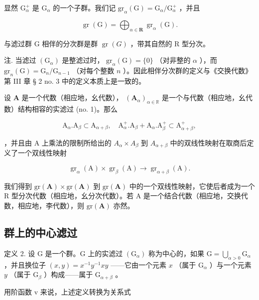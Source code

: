 显然 \(\mathrm{G}_{\alpha}^{+}\) 是 \(\mathrm{G}_{\alpha}\) 的一个子群。我们记 \(\mathrm{gr}_{\alpha}(\mathrm{G}) = \mathrm{G}_{\alpha} / \mathrm{G}_{\alpha}^{+}\) ，并且

\[
\operatorname{gr} (\mathrm{G}) = \bigoplus_ {\alpha \in \mathbf {R}} \operatorname{gr} _ {\alpha} (\mathrm{G}).
\]

与滤过群 G 相伴的分次群是群 \(\operatorname{gr}(G)\) ，带其自然的 R 型分次。

注. 当滤过 \((\mathrm{G}_{\alpha})\) 是整滤过时， \(\mathrm{gr}_{\alpha}(\mathrm{G}) = \{0\}\) （对非整的 \(\alpha\) ），而 \(\mathrm{gr}_n(\mathrm{G}) = \mathrm{G}_n / \mathrm{G}_{n - 1}\) （对每个整数 \(n\) ）。因此相伴分次群的定义与《交换代数》第 III 章 § 2 no. 3 中的定义本质上是一致的。

设 \(\mathbf{A}\) 是一个代数（相应地，幺代数）， \((\mathbf{A}_{\alpha})_{\alpha \in \mathbb{R}}\) 是一个与代数（相应地，幺代数）结构相容的实滤过 (no. 1)。那么

\[
\mathrm{A} _ {\alpha}. \mathrm{A} _ {\beta} \subset \mathrm{A} _ {\alpha + \beta}, \quad \mathrm{A} _ {\alpha} ^ {+}. \mathrm{A} _ {\beta} + \mathrm{A} _ {\alpha}. \mathrm{A} _ {\beta} ^ {+} \subset \mathrm{A} _ {\alpha + \beta} ^ {+},
\]

，并且由 A 上乘法的限制所给出的 \(A_{\alpha} \times A_{\beta}\) 到 \(A_{\alpha+\beta}\) 中的双线性映射在取商后定义了一个双线性映射

\[
\operatorname{gr} _ {\alpha} (\mathrm{A}) \times \operatorname{gr} _ {\beta} (\mathrm{A}) \rightarrow \operatorname{gr} _ {\alpha + \beta} (\mathrm{A}).
\]

我们得到 \(\mathrm{gr}(\mathbf{A}) \times \mathrm{gr}(\mathbf{A})\) 到 \(\mathrm{gr}(\mathbf{A})\) 中的一个双线性映射，它使后者成为一个 R 型分次代数（相应地，幺分次代数）。若 A 是一个结合代数（相应地，交换代数，相应地，李代数），则 \(\mathrm{gr}(\mathbf{A})\) 亦然。

\subsection{群上的中心滤过}

定义 2. 设 G 是一个群。G 上的实滤过 \((\mathrm{G}_{\alpha})\) 称为中心的，如果 \(\mathrm{G} = \bigcup_{\alpha >0}\mathrm{G}_{\alpha}\) ，并且换位子 \((x,y) = x^{-1}y^{-1}xy\) ——它由一个元素 \(x\) （属于 \(\mathrm{G}_{\alpha}\) ）与一个元素 \(y\) （属于 \(\mathrm{G}_{\beta}\) ）构成——属于 \(\mathrm{G}_{\alpha +\beta}\) 。

用阶函数 v 来说，上述定义转换为关系式

